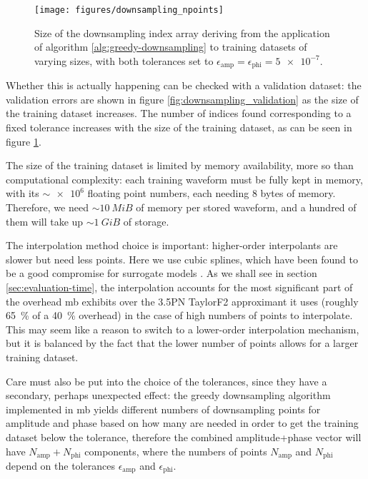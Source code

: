 \documentclass[main.tex]{subfiles}
\begin{document}
\begin{figure}[ht]
\centering
\texttt{[image: figures/downsampling\_npoints]}
\caption{Size of the downsampling index array deriving from the application of algorithm \ref{alg:greedy-downsampling} to training datasets of varying sizes, with both tolerances set to \(\epsilon _{\text{amp}} =\epsilon _{\text{phi}} = \num{5e-7}\). }
\label{fig:downsampling_npoints}
\end{figure}

Whether this is actually happening can be checked with a validation dataset: the validation errors are shown in figure \ref{fig:downsampling_validation} as the size of the training dataset increases.
The number of indices found corresponding to a fixed tolerance increases with the size of the training dataset, as can be seen in figure \ref{fig:downsampling_npoints}. 

The size of the training dataset is limited by memory availability, more so than computational complexity: each training waveform must be fully kept in memory, with its \(\sim \num{e6}\) floating point numbers, each needing 8 bytes of memory. 
Therefore, we need \(\sim \SI{10}{MiB}\) of memory per stored waveform, and a hundred of them will take up \( \sim \SI{1}{GiB}\) of storage. 

The interpolation method choice is important: higher-order interpolants are slower but need less points.
Here we use cubic splines, which have been found to be a good compromise for surrogate models \cite{lackeySurrogateModelAlignedspin2019}.
As we shall see in section \ref{sec:evaluation-time}, the interpolation accounts for the most significant part of the overhead \ac{mb} exhibits over the 3.5PN TaylorF2 approximant it uses (roughly \SI{65}{\percent} of a \SI{40}{\percent} overhead) in the case of high numbers of points to interpolate. 
This may seem like a reason to switch to a lower-order interpolation mechanism, but it is balanced by the fact that the lower number of points allows for a larger training dataset. 

Care must also be put into the choice of the tolerances, since they have a secondary, perhaps unexpected effect: the greedy downsampling algorithm implemented in \ac{mb} yields different numbers of downsampling points for amplitude and phase based on how many are needed in order to get the training dataset below the tolerance, therefore the combined amplitude+phase vector will have \(N _{\text{amp}} + N _{\text{phi}}\) components, where the numbers of points \(N _{\text{amp}}\) and \(N _{\text{phi}}\) depend on the tolerances \( \epsilon _{\text{amp}}\) and \(\epsilon _{\text{phi}}\). 
\end{document}
